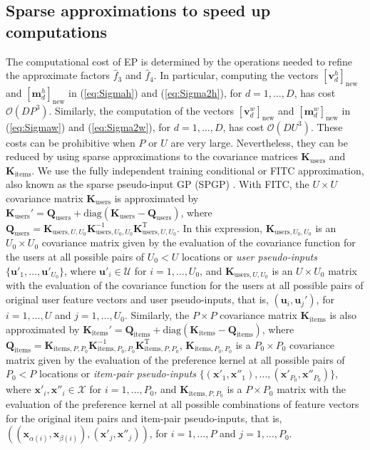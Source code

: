 \documentclass{article}
\begin{document}
\subsection{Sparse approximations to speed up computations} \label{sec:sparse}

The computational cost of EP is determined by the operations needed to refine the approximate factors $\hat{f}_3$ and $\hat{f}_4$.
In particular, computing the vectors $[\mathbf{v}_{d}^{h}]_\text{new}$ and $[\mathbf{m}_{d}^{h}]_\text{new}$ in
(\ref{eq:Sigmah}) and (\ref{eq:Sigma2h}), for $d = 1,\ldots,D$, has cost $\mathcal{O}(DP^3)$. Similarly,
the computation of the vectors $[\mathbf{v}_{d}^{w}]_\text{new}$ and $[\mathbf{m}_{d}^{w}]_\text{new}$ in
(\ref{eq:Sigmaw}) and (\ref{eq:Sigma2w}), for $d = 1,\ldots,D$, has cost $\mathcal{O}(DU^3)$.
These costs can be prohibitive when $P$ or $U$ are very large.
Nevertheless, they can be reduced by using sparse approximations to the covariance matrices $\mathbf{K}_\text{users}$
and $\mathbf{K}_\text{items}$. We use the fully independent training conditional or FITC
approximation, also known as the sparse pseudo-input GP (SPGP) \cite{snelson2006}.
With FITC, the $U \times U$ covariance matrix $\mathbf{K}_\text{users}$ is approximated by
$\mathbf{K}_\text{users}' = \mathbf{Q}_\text{users} + \text{diag}(\mathbf{K}_\text{users}-\mathbf{Q}_\text{users})$,
where $\mathbf{Q}_\text{users} = \mathbf{K}_{\text{users},U,U_0} \mathbf{K}_{\text{users},U_0,U_0}^{-1} \mathbf{K}_{\text{users},U,U_0}^\text{T}$.
In this expression, $\mathbf{K}_{\text{users},U_0,U_0}$ is an $U_0 \times U_0$ covariance matrix given by the evaluation
of the covariance function for the users at all possible pairs of $U_0 < U$ locations
or \emph{user pseudo-inputs} $\{\mathbf{u}'_1,\ldots,\mathbf{u}'_{U_0}\}$,
where $\mathbf{u}'_i \in \mathcal{U}$ for $i = 1,\ldots,U_0$, and
$\mathbf{K}_{\text{users},U,U_0}$ is an $U \times U_0$ matrix with the evaluation of
the covariance function for the users at all possible pairs of original user feature vectors and user pseudo-inputs,
that is, $(\mathbf{u}_i, \mathbf{u}_j')$, for $i = 1,\ldots,U$ and $j = 1,\ldots,U_0$.
Similarly, the $P \times P$ covariance matrix $\mathbf{K}_\text{items}$ is also approximated by
$\mathbf{K}_\text{items}' = \mathbf{Q}_\text{items} + \text{diag}(\mathbf{K}_\text{items}-\mathbf{Q}_\text{items})$,
where $\mathbf{Q}_\text{items} = \mathbf{K}_{\text{items},P,P_0} \mathbf{K}_{\text{items},P_0,P_0}^{-1} \mathbf{K}_{\text{items},P,P_0}^\text{T}$,
$\mathbf{K}_{\text{items},P_0,P_0}$ is a $P_0 \times P_0$ covariance matrix given by the evaluation
of the preference kernel at all possible pairs of $P_0 < P$ locations or
\emph{item-pair pseudo-inputs} $\{(\mathbf{x}'_1,\mathbf{x}''_1),\ldots,(\mathbf{x}'_{P_0},\mathbf{x}''_{P_0})\}$,
where $\mathbf{x}'_i,\mathbf{x}''_i \in \mathcal{X}$ for $i = 1,\ldots,P_0$,
and $\mathbf{K}_{\text{items},P,P_0}$ is a $P \times P_0$ matrix with the evaluation of
the preference kernel at all possible combinations of feature vectors for the original item pairs and item-pair pseudo-inputs,
that is, $((\mathbf{x}_{\alpha(i)},\mathbf{x}_{\beta(i)}), (\mathbf{x}'_j,\mathbf{x}''_j))$, for $i = 1,\ldots,P$ and $j = 1,\ldots,P_0$.
\end{document}
